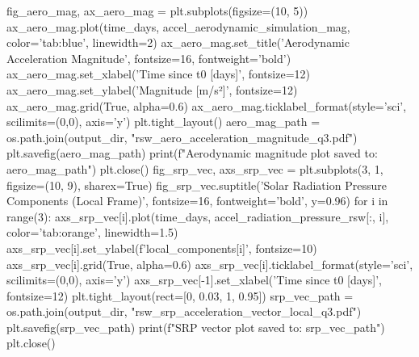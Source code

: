 \markdownRendererInterblockSeparator
{}
\markdownRendererSectionEnd \markdownRendererSectionBegin
\markdownRendererHeadingOne{-------------------------------------------------------------------------}\markdownRendererInterblockSeparator
{}fig_aero_mag, ax_aero_mag = plt.subplots(figsize=(10, 5)) ax_aero_mag.plot(time_days, accel_aerodynamic_simulation_mag, color='tab:blue', linewidth=2) ax_aero_mag.set_title('Aerodynamic Acceleration Magnitude', fontsize=16, fontweight='bold') ax_aero_mag.set_xlabel('Time since t0 [days]', fontsize=12) ax_aero_mag.set_ylabel('Magnitude [m/s²]', fontsize=12) ax_aero_mag.grid(True, alpha=0.6) ax_aero_mag.ticklabel_format(style='sci', scilimits=(0,0), axis='y') plt.tight_layout() aero_mag_path = os.path.join(output_dir, "rsw_aero_acceleration_magnitude_q3.pdf") plt.savefig(aero_mag_path) print(f"Aerodynamic magnitude plot saved to: {aero_mag_path}") plt.close()\markdownRendererInterblockSeparator
{}
\markdownRendererSectionEnd \markdownRendererSectionBegin
\markdownRendererHeadingOne{-------------------------------------------------------------------------}\markdownRendererInterblockSeparator
{}
\markdownRendererSectionEnd \markdownRendererSectionBegin
{}\markdownRendererInterblockSeparator
{}
\markdownRendererSectionEnd \markdownRendererSectionBegin
\markdownRendererHeadingOne{-------------------------------------------------------------------------}\markdownRendererInterblockSeparator
{}fig_srp_vec, axs_srp_vec = plt.subplots(3, 1, figsize=(10, 9), sharex=True) fig_srp_vec.suptitle('Solar Radiation Pressure Components (Local Frame)', fontsize=16, fontweight='bold', y=0.96) for i in range(3): axs_srp_vec[i].plot(time_days, accel_radiation_pressure_rsw[:, i], color='tab:orange', linewidth=1.5) axs_srp_vec[i].set_ylabel(f'{local_components[i]}\n[m/s²]', fontsize=10) axs_srp_vec[i].grid(True, alpha=0.6) axs_srp_vec[i].ticklabel_format(style='sci', scilimits=(0,0), axis='y') axs_srp_vec[-1].set_xlabel('Time since t0 [days]', fontsize=12) plt.tight_layout(rect=[0, 0.03, 1, 0.95]) srp_vec_path = os.path.join(output_dir, "rsw_srp_acceleration_vector_local_q3.pdf") plt.savefig(srp_vec_path) print(f"SRP vector plot saved to: {srp_vec_path}") plt.close()\markdownRendererInterblockSeparator
{}
\markdownRendererSectionEnd \markdownRendererSectionBegin
\markdownRendererHeadingOne{-------------------------------------------------------------------------}\markdownRendererInterblockSeparator
{}
